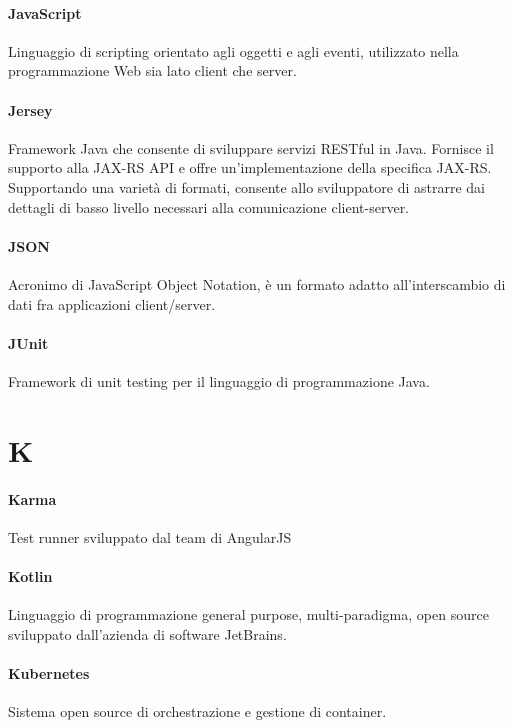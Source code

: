 \documentclass[]{article}
\begin{document}
	\paragraph*{JavaScript}
	Linguaggio di scripting orientato agli oggetti e agli eventi, utilizzato nella programmazione Web sia lato client che server.

	\paragraph*{Jersey}
	Framework Java che consente di sviluppare servizi RESTful in Java. Fornisce il supporto alla JAX-RS API e offre un’implementazione della specifica JAX-RS. Supportando una varietà di formati, consente allo sviluppatore di astrarre dai dettagli di basso livello necessari alla comunicazione client-server.

    \paragraph*{JSON}
    Acronimo di JavaScript Object Notation, è un formato adatto all'interscambio di dati fra applicazioni client/server.

	\paragraph*{JUnit}
	Framework di unit testing per il linguaggio di programmazione Java.

	\newpage

	\section*{K}

	\paragraph*{Karma}
	Test runner sviluppato dal team di AngularJS

	\paragraph*{Kotlin}
	Linguaggio di programmazione general purpose, multi-paradigma, open source sviluppato dall'azienda di software JetBrains.

	\paragraph*{Kubernetes}
	Sistema open source di orchestrazione e gestione di container.
\end{document}
